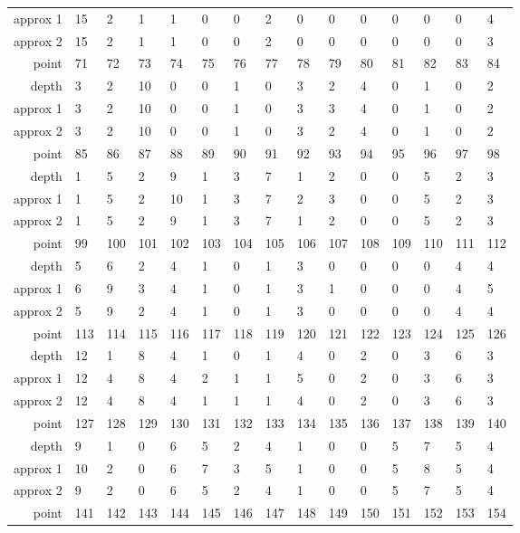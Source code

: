 \begin{center}
\begin{supertabular}{|r|l l l l l l l l l l l l l l|}
approx 1 & 15 & 2 & 1 & 1 & 0 & 0 & 2 & 0 & 0 & 0 & 0 & 0 & 0 & 4 \\
approx 2 & 15 & 2 & 1 & 1 & 0 & 0 & 2 & 0 & 0 & 0 & 0 & 0 & 0 & 3 \\
\hline
point & 71 & 72 & 73 & 74 & 75 & 76 & 77 & 78 & 79 & 80 & 81 & 82 & 83 & 84 \\
\hline
depth & 3 & 2 & 10 & 0 & 0 & 1 & 0 & 3 & 2 & 4 & 0 & 1 & 0 & 2 \\
approx 1 & 3 & 2 & 10 & 0 & 0 & 1 & 0 & 3 & 3 & 4 & 0 & 1 & 0 & 2 \\
approx 2 & 3 & 2 & 10 & 0 & 0 & 1 & 0 & 3 & 2 & 4 & 0 & 1 & 0 & 2 \\
\hline
point & 85 & 86 & 87 & 88 & 89 & 90 & 91 & 92 & 93 & 94 & 95 & 96 & 97 & 98 \\
\hline
depth & 1 & 5 & 2 & 9 & 1 & 3 & 7 & 1 & 2 & 0 & 0 & 5 & 2 & 3 \\
approx 1 & 1 & 5 & 2 & 10 & 1 & 3 & 7 & 2 & 3 & 0 & 0 & 5 & 2 & 3 \\
approx 2 & 1 & 5 & 2 & 9 & 1 & 3 & 7 & 1 & 2 & 0 & 0 & 5 & 2 & 3 \\
\hline
point & 99 & 100 & 101 & 102 & 103 & 104 & 105 & 106 & 107 & 108 & 109 & 110 & 111 & 112 \\
\hline
depth & 5 & 6 & 2 & 4 & 1 & 0 & 1 & 3 & 0 & 0 & 0 & 0 & 4 & 4 \\
approx 1 & 6 & 9 & 3 & 4 & 1 & 0 & 1 & 3 & 1 & 0 & 0 & 0 & 4 & 5 \\
approx 2 & 5 & 9 & 2 & 4 & 1 & 0 & 1 & 3 & 0 & 0 & 0 & 0 & 4 & 4 \\
\hline
point & 113 & 114 & 115 & 116 & 117 & 118 & 119 & 120 & 121 & 122 & 123 & 124 & 125 & 126 \\
\hline
depth & 12 & 1 & 8 & 4 & 1 & 0 & 1 & 4 & 0 & 2 & 0 & 3 & 6 & 3 \\
approx 1 & 12 & 4 & 8 & 4 & 2 & 1 & 1 & 5 & 0 & 2 & 0 & 3 & 6 & 3 \\
approx 2 & 12 & 4 & 8 & 4 & 1 & 1 & 1 & 4 & 0 & 2 & 0 & 3 & 6 & 3 \\
\hline
point & 127 & 128 & 129 & 130 & 131 & 132 & 133 & 134 & 135 & 136 & 137 & 138 & 139 & 140 \\
\hline
depth & 9 & 1 & 0 & 6 & 5 & 2 & 4 & 1 & 0 & 0 & 5 & 7 & 5 & 4 \\
approx 1 & 10 & 2 & 0 & 6 & 7 & 3 & 5 & 1 & 0 & 0 & 5 & 8 & 5 & 4 \\
approx 2 & 9 & 2 & 0 & 6 & 5 & 2 & 4 & 1 & 0 & 0 & 5 & 7 & 5 & 4 \\
\hline
point & 141 & 142 & 143 & 144 & 145 & 146 & 147 & 148 & 149 & 150 & 151 & 152 & 153 & 154 \\

\end{supertabular}
\end{center}
